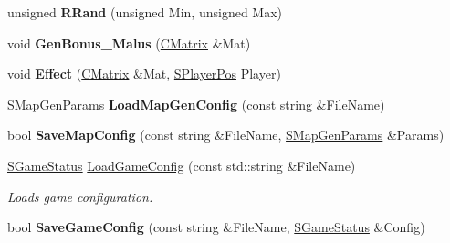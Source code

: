 \begin{DoxyCompactItemize}
\item 
\hypertarget{namespace_chase_game_aee2df7cbf4974e167612a7415943f3b0}{unsigned {\bfseries R\-Rand} (unsigned Min, unsigned Max)}\label{namespace_chase_game_aee2df7cbf4974e167612a7415943f3b0}

\item 
\hypertarget{namespace_chase_game_a831cfcb5623ab30034f57cbfff28c720}{void {\bfseries Gen\-Bonus\-\_\-\-Malus} (\hyperlink{namespace_chase_game_a469449f9237e59efce3982127366c550}{C\-Matrix} \&Mat)}\label{namespace_chase_game_a831cfcb5623ab30034f57cbfff28c720}

\item 
\hypertarget{namespace_chase_game_a0e3e15bf28c7e96d0ba0bd14094ba71f}{void {\bfseries Effect} (\hyperlink{namespace_chase_game_a469449f9237e59efce3982127366c550}{C\-Matrix} \&Mat, \hyperlink{struct_chase_game_1_1_s_player_pos}{S\-Player\-Pos} Player)}\label{namespace_chase_game_a0e3e15bf28c7e96d0ba0bd14094ba71f}

\item 
\hypertarget{namespace_chase_game_a4779af792d3de8e274049bf2019e0343}{\hyperlink{struct_chase_game_1_1_s_map_gen_params}{S\-Map\-Gen\-Params} {\bfseries Load\-Map\-Gen\-Config} (const string \&File\-Name)}\label{namespace_chase_game_a4779af792d3de8e274049bf2019e0343}

\item 
\hypertarget{namespace_chase_game_a98e8d90127c802c1445266e39966c3fb}{bool {\bfseries Save\-Map\-Config} (const string \&File\-Name, \hyperlink{struct_chase_game_1_1_s_map_gen_params}{S\-Map\-Gen\-Params} \&Params)}\label{namespace_chase_game_a98e8d90127c802c1445266e39966c3fb}

\item 
\hyperlink{struct_chase_game_1_1_s_game_status}{S\-Game\-Status} \hyperlink{namespace_chase_game_addd460052ec5a5fe3010665ca84b07ec}{Load\-Game\-Config} (const std\-::string \&File\-Name)
\begin{DoxyCompactList}\small\item\em Loads game configuration. \end{DoxyCompactList}\item 
\hypertarget{namespace_chase_game_a39f8b039151b1a3eef82fdc1c6f52091}{bool {\bfseries Save\-Game\-Config} (const string \&File\-Name, \hyperlink{struct_chase_game_1_1_s_game_status}{S\-Game\-Status} \&Config)}\label{namespace_chase_game_a39f8b039151b1a3eef82fdc1c6f52091}


\end{DoxyCompactItemize}
